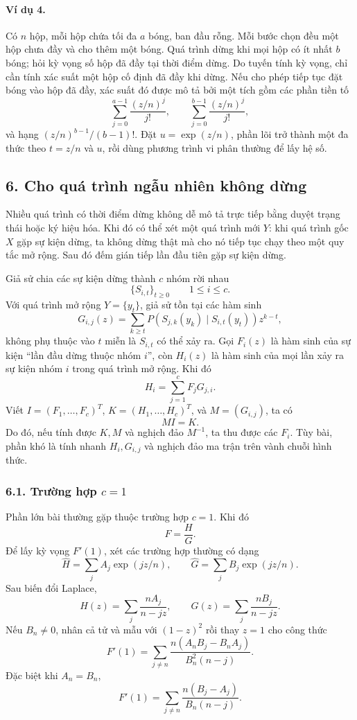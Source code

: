 \documentclass[11pt]{article}
\begin{document}
\paragraph{Ví dụ 4.}
Có \(n\) hộp, mỗi hộp chứa tối đa \(a\) bóng, ban đầu rỗng. Mỗi bước chọn đều
một hộp chưa đầy và cho thêm một bóng. Quá trình dừng khi mọi hộp có ít nhất
\(b\) bóng; hỏi kỳ vọng số hộp đã đầy tại thời điểm dừng. Do tuyến tính kỳ
vọng, chỉ cần tính xác suất một hộp cố định đã đầy khi dừng. Nếu cho phép tiếp
tục đặt bóng vào hộp đã đầy, xác suất đó được mô tả bởi một tích gồm các phần
tiền tố
\[
  \sum_{j=0}^{a-1}\frac{(z/n)^j}{j!},\qquad
  \sum_{j=0}^{b-1}\frac{(z/n)^j}{j!},
\]
và hạng \((z/n)^{b-1}/(b-1)!\). Đặt \(u=\exp(z/n)\), phần lõi trở thành một đa
thức theo \(t=z/n\) và \(u\), rồi dùng phương trình vi phân thường để lấy hệ số.

\subsection*{6. Cho quá trình ngẫu nhiên không dừng}

Nhiều quá trình có thời điểm dừng không dễ mô tả trực tiếp bằng duyệt trạng
thái hoặc ký hiệu hóa. Khi đó có thể xét một quá trình mới \(Y\): khi quá trình
gốc \(X\) gặp sự kiện dừng, ta không dừng thật mà cho nó tiếp tục chạy theo một
quy tắc mở rộng. Sau đó đếm gián tiếp lần đầu tiên gặp sự kiện dừng.

Giả sử chia các sự kiện dừng thành \(c\) nhóm rời nhau
\[
  \{S_{i,t}\}_{t\ge 0}\qquad 1\le i\le c.
\]
Với quá trình mở rộng \(Y=\{y_t\}\), giả sử tồn tại các hàm sinh
\[
  G_{i,j}(z)=\sum_{k\ge t}P(S_{j,k}(y_k)\mid S_{i,t}(y_t))z^{k-t},
\]
không phụ thuộc vào \(t\) miễn là \(S_{i,t}\) có thể xảy ra. Gọi \(F_i(z)\) là
hàm sinh của sự kiện ``lần đầu dừng thuộc nhóm \(i\)'', còn \(H_i(z)\) là hàm
sinh của mọi lần xảy ra sự kiện nhóm \(i\) trong quá trình mở rộng. Khi đó
\[
  H_i=\sum_{j=1}^c F_jG_{j,i}.
\]
Viết \(I=(F_1,\ldots,F_c)^T\), \(K=(H_1,\ldots,H_c)^T\), và
\(M=(G_{i,j})\), ta có
\[
  MI=K.
\]
Do đó, nếu tính được \(K,M\) và nghịch đảo \(M^{-1}\), ta thu được các
\(F_i\). Tùy bài, phần khó là tính nhanh \(H_i,G_{i,j}\) và nghịch đảo ma trận
trên vành chuỗi hình thức.

\subsubsection*{6.1. Trường hợp \(c=1\)}

Phần lớn bài thường gặp thuộc trường hợp \(c=1\). Khi đó
\[
  F=\frac HG.
\]
Để lấy kỳ vọng \(F'(1)\), xét các trường hợp thường có dạng
\[
  \widehat H=\sum_j A_j\exp(jz/n),\qquad
  \widehat G=\sum_j B_j\exp(jz/n).
\]
Sau biến đổi Laplace,
\[
  H(z)=\sum_j\frac{nA_j}{n-jz},\qquad
  G(z)=\sum_j\frac{nB_j}{n-jz}.
\]
Nếu \(B_n\ne 0\), nhân cả tử và mẫu với \((1-z)^2\) rồi thay \(z=1\) cho công
thức
\[
  F'(1)=
  \sum_{j\ne n}\frac{n(A_nB_j-B_nA_j)}{B_n^2(n-j)}.
\]
Đặc biệt khi \(A_n=B_n\),
\[
  F'(1)=
  \sum_{j\ne n}\frac{n(B_j-A_j)}{B_n(n-j)}.
\]
\end{document}
